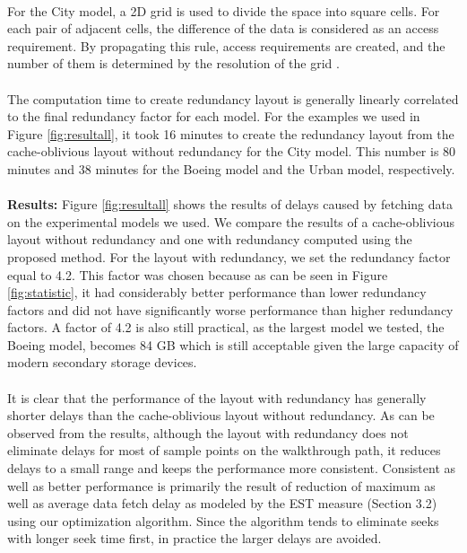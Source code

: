 \\
For the City model, a 2D grid is used to divide the space into square cells.
For each pair of adjacent cells, the difference of the data is considered as an
access requirement. By propagating this rule, access requirements are created,
and the number of them is determined by the resolution of the grid
\cite{singleseeklayout}.\\
\\
The computation time to create redundancy layout is generally linearly correlated to the final redundancy factor for each model. For the examples we used in Figure \ref{fig:resultall}, it took 16 minutes to create the redundancy layout from the cache-oblivious layout without redundancy for the City model. This number is 80 minutes and 38 minutes for the Boeing model and the Urban model, respectively. \\
\\
\textbf{Results:}
Figure \ref{fig:resultall} shows the results of delays caused by fetching data on the experimental models we used. We compare the results of a cache-oblivious layout without redundancy \cite{cacheobliviouslayout} and one with redundancy computed using the proposed method. For the layout with redundancy, we set the redundancy factor equal to 4.2. This factor was chosen because as can be seen in Figure \ref{fig:statistic}, it had considerably better performance than lower redundancy factors and did not have significantly worse performance than higher redundancy factors. A factor of 4.2 is also still practical, as the largest model we tested, the Boeing model, becomes 84 GB which is still acceptable given the large capacity of modern secondary storage devices.\\
\\
It is clear that the performance of the layout with redundancy has generally shorter delays than the cache-oblivious layout without redundancy. As can be observed from the results, although the layout with redundancy does not eliminate delays for most of sample points on the walkthrough path, it reduces delays to a small range and keeps the performance more consistent. Consistent as well as better performance is primarily the result of reduction of maximum as well as average data fetch delay as modeled by the EST measure (Section 3.2) using our optimization algorithm. Since the algorithm tends to eliminate seeks with longer seek time first, in practice the larger delays are avoided.
